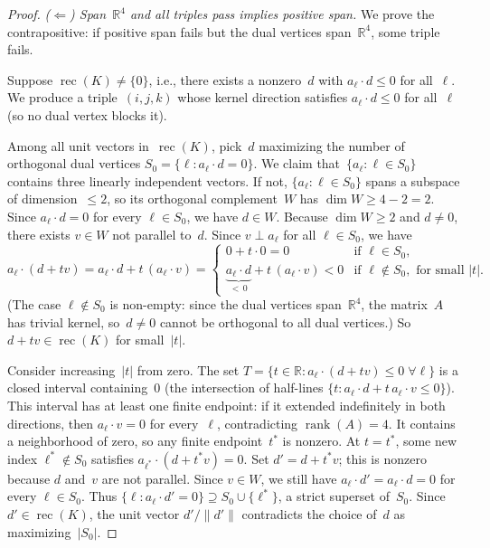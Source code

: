 \begin{unverified}
\begin{proof}
\medskip\noindent\emph{($\Leftarrow$) Span~$\mathbb{R}^4$ and all triples
pass implies positive span.}
We prove the contrapositive: if positive span fails but the dual vertices
span~$\mathbb{R}^4$, some triple fails.

Suppose $\operatorname{rec}(K) \neq \{0\}$, i.e., there exists a nonzero~$d$
with $a_\ell \cdot d \le 0$ for all~$\ell$. We produce a triple~$(i,j,k)$
whose kernel direction satisfies $a_\ell \cdot d \le 0$ for all~$\ell$
(so no dual vertex blocks it).

Among all unit vectors in~$\operatorname{rec}(K)$, pick~$d$ maximizing the
number of orthogonal dual vertices $S_0 = \{\ell : a_\ell \cdot d = 0\}$.  We claim
that~$\{a_\ell : \ell \in S_0\}$ contains three linearly independent vectors.
If not, $\{a_\ell : \ell \in S_0\}$ spans a subspace of dimension~$\le 2$,
so its orthogonal complement~$W$ has $\dim W \ge 4 - 2 = 2$.  Since
$a_\ell \cdot d = 0$ for every $\ell \in S_0$, we have $d \in W$.  Because
$\dim W \ge 2$ and $d \ne 0$, there exists $v \in W$ not parallel to~$d$.
Since $v \perp a_\ell$ for all $\ell \in S_0$, we have
\[
  a_\ell \cdot (d + tv) = a_\ell \cdot d + t\,(a_\ell \cdot v)
  = \begin{cases}
    0 + t \cdot 0 = 0 & \text{if } \ell \in S_0, \\
    \underbrace{a_\ell \cdot d}_{<\,0} + t\,(a_\ell \cdot v) < 0
    & \text{if } \ell \notin S_0, \text{ for small } |t|.
  \end{cases}
\]
(The case $\ell \notin S_0$ is non-empty: since the dual vertices span~$\mathbb{R}^4$,
the matrix~$A$ has trivial kernel, so~$d \ne 0$ cannot be orthogonal to all
dual vertices.)
So $d + tv \in \operatorname{rec}(K)$ for small~$|t|$.

Consider increasing~$|t|$ from zero.  The set
$T = \{t \in \mathbb{R} : a_\ell \cdot (d + tv) \le 0 \;\forall \ell\}$ is
a closed interval containing~$0$ (the intersection of half-lines
$\{t : a_\ell \cdot d + t\,a_\ell \cdot v \le 0\}$).  This interval has
at least one finite endpoint: if it extended indefinitely in both directions,
then $a_\ell\cdot v=0$ for every~$\ell$, contradicting
$\operatorname{rank}(A)=4$.  It contains a neighborhood of zero, so any
finite endpoint~$t^*$ is nonzero.  At $t = t^*$, some new index
$\ell^* \notin S_0$ satisfies $a_{\ell^*} \cdot (d + t^* v) = 0$.  Set
$d' = d + t^* v$; this is nonzero because $d$ and~$v$ are not parallel.
Since $v \in W$, we still have $a_\ell \cdot d' = a_\ell \cdot d = 0$
for every $\ell \in S_0$.  Thus
$\{\ell : a_\ell \cdot d' = 0\} \supseteq S_0 \cup \{\ell^*\}$,
a strict superset of~$S_0$.  Since $d' \in \operatorname{rec}(K)$, the unit
vector $d' / \|d'\|$ contradicts the choice of~$d$ as maximizing~$|S_0|$.


\end{proof}
\end{unverified}
